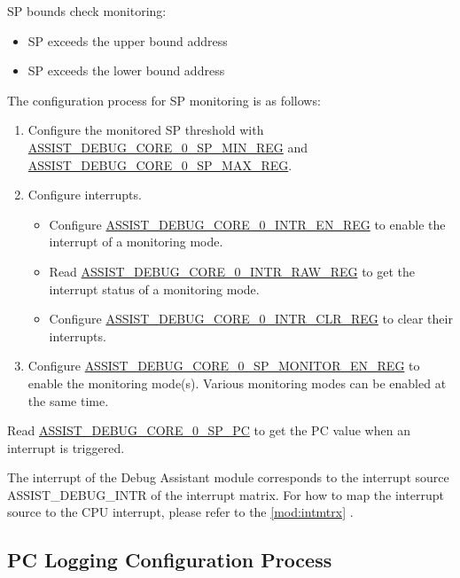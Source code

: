 \documentclass[main\_\_EN.tex]{subfiles}
\begin{document}
SP bounds check monitoring:
\begin{itemize}
    \item SP exceeds the upper bound address
    \item SP exceeds the lower bound address
\end{itemize}


The configuration process for SP monitoring is as follows:

\begin{enumerate}
    \item Configure the monitored SP threshold with \hyperref[regdesc:ASSISTDEBUGCORE0SPMINREG]{ASSIST\_DEBUG\_CORE\_0\_SP\_MIN\_REG} and\\ \hyperref[regdesc:ASSISTDEBUGCORE0SPMAXREG]{ASSIST\_DEBUG\_CORE\_0\_SP\_MAX\_REG}.
    \item Configure interrupts.
    \begin{itemize}
        \item Configure \hyperref[regdesc:ASSISTDEBUGCORE0INTRENREG]{ASSIST\_DEBUG\_CORE\_0\_INTR\_EN\_REG} to enable the interrupt of a monitoring mode. 
        \item Read \hyperref[regdesc:ASSISTDEBUGCORE0INTRRAWREG]{ASSIST\_DEBUG\_CORE\_0\_INTR\_RAW\_REG} to get the interrupt status of a monitoring mode. 
        \item Configure \hyperref[regdesc:ASSISTDEBUGCORE0INTRCLRREG]{ASSIST\_DEBUG\_CORE\_0\_INTR\_CLR\_REG} to clear their interrupts.
    \end{itemize}
    \item Configure \hyperref[regdesc:ASSISTDEBUGCORE0SPMONITORENREG]{ASSIST\_DEBUG\_CORE\_0\_SP\_MONITOR\_EN\_REG} to enable the monitoring mode(s). Various monitoring modes can be enabled at the same time.
\end{enumerate}

Read \hyperref[fielddesc:ASSISTDEBUGCORE0SPPC]{ASSIST\_DEBUG\_CORE\_0\_SP\_PC} to get the PC value when an interrupt is triggered.

The interrupt of the Debug Assistant module corresponds to the interrupt source ASSIST\_DEBUG\_INTR of the interrupt matrix. For how to map the interrupt source to the CPU interrupt, please refer to the \ref{mod:intmtrx} \textit{}.


\subsection{PC Logging Configuration Process}
\end{document}
